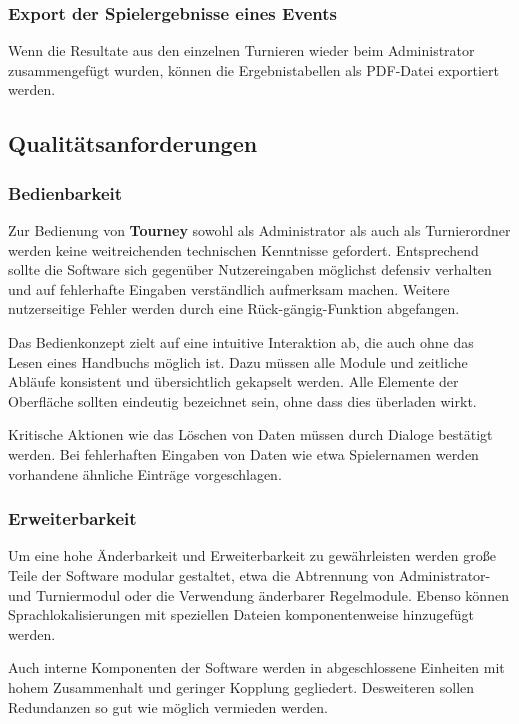 \documentclass[11pt]{article}
\begin{document}
\subsubsection{Export der Spielergebnisse eines Events}

Wenn die Resultate aus den einzelnen Turnieren wieder beim Administrator zusammengefügt wurden, können die Ergebnistabellen als PDF-Datei exportiert werden.

\newpage

\subsection{Qualitätsanforderungen}

\subsubsection{Bedienbarkeit}

Zur Bedienung von \textbf{Tourney} sowohl als Administrator als auch als Turnierordner werden keine weitreichenden technischen Kenntnisse gefordert. Entsprechend sollte die Software sich gegenüber Nutzereingaben möglichst defensiv verhalten und auf fehlerhafte Eingaben verständlich aufmerksam machen. Weitere nutzerseitige Fehler werden durch eine Rück-gängig-Funktion abgefangen.

Das Bedienkonzept zielt auf eine intuitive Interaktion ab, die auch ohne das Lesen eines Handbuchs möglich ist. Dazu müssen alle Module und zeitliche Abläufe konsistent und übersichtlich gekapselt werden. Alle Elemente der Oberfläche sollten eindeutig bezeichnet sein, ohne dass dies überladen wirkt.

Kritische Aktionen wie das Löschen von Daten müssen durch Dialoge bestätigt werden. Bei fehlerhaften Eingaben von Daten wie etwa Spielernamen werden vorhandene ähnliche Einträge vorgeschlagen.

\subsubsection{Erweiterbarkeit}

Um eine hohe Änderbarkeit und Erweiterbarkeit zu gewährleisten werden große Teile der Software modular gestaltet, etwa die Abtrennung von Administrator- und Turniermodul oder die Verwendung änderbarer Regelmodule. Ebenso können Sprachlokalisierungen mit speziellen Dateien komponentenweise hinzugefügt werden.

Auch interne Komponenten der Software werden in abgeschlossene Einheiten mit hohem Zusammenhalt und geringer Kopplung gegliedert. Desweiteren sollen Redundanzen so gut wie möglich vermieden werden.
\end{document}
